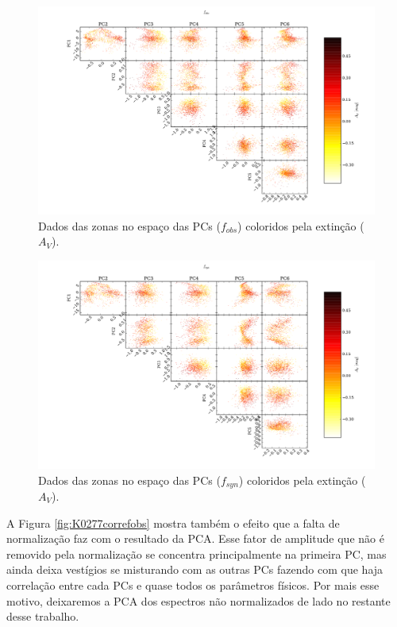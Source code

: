 \begin{figure}
	\includegraphics[width=1.3\textwidth, angle=-90]{figuras/K0277-f_obs_norm-corre_PCxPC_AV.pdf}
	\caption[Dados no espaço das PCs vs AV- $f_{obs}$.]
    {Dados das zonas no espaço das PCs ($f_{obs}$) coloridos pela extinção ($A_V$).}
    \label{fig:K0277correfobsnormPCvsPC:AV}	
\end{figure}

\begin{figure}
	\includegraphics[width=1.3\textwidth, angle=-90]{figuras/K0277-f_syn_norm-corre_PCxPC_AV.pdf}
	\caption[Dados no espaço das PCs vs AV- $f_{syn}$.]
    {Dados das zonas no espaço das PCs ($f_{syn}$) coloridos pela extinção ($A_V$).}
    \label{fig:K0277correfsynnormPCvsPC:AV}	
\end{figure}

A Figura \ref{fig:K0277correfobs} mostra também o efeito que a falta de normalização faz com o resultado da PCA. Esse
fator de amplitude que não é removido pela normalização se concentra principalmente na primeira PC, mas ainda deixa
vestígios se misturando com as outras PCs fazendo com que haja correlação entre cada PCs e quase todos os parâmetros
físicos. Por mais esse motivo, deixaremos a PCA dos espectros não normalizados de lado no restante desse trabalho.

